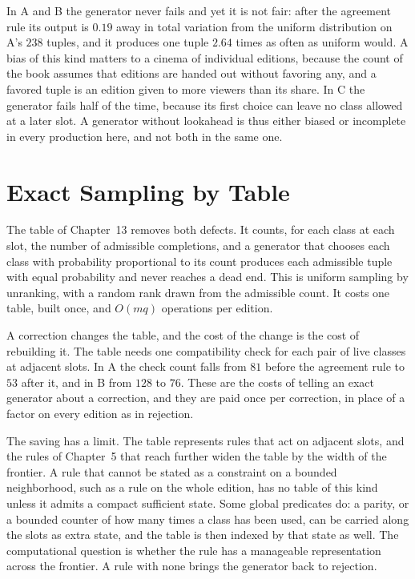 \documentclass[11pt,twoside,openright]{book}
\theoremstyle{plain}
\theoremstyle{definition}
\theoremstyle{remark}
\begin{document}
In A and B the generator never fails and yet it is not fair: after the agreement rule its output is $0.19$ away in total variation from the uniform distribution on A's $238$ tuples, and it produces one tuple $2.64$ times as often as uniform would. A bias of this kind matters to a cinema of individual editions, because the count of the book assumes that editions are handed out without favoring any, and a favored tuple is an edition given to more viewers than its share. In C the generator fails half of the time, because its first choice can leave no class allowed at a later slot. A generator without lookahead is thus either biased or incomplete in every production here, and not both in the same one.

\section{Exact Sampling by Table}\label{sec:table16}

The table of Chapter~13 removes both defects. It counts, for each class at each slot, the number of admissible completions, and a generator that chooses each class with probability proportional to its count produces each admissible tuple with equal probability and never reaches a dead end. This is uniform sampling by unranking, with a random rank drawn from the admissible count. It costs one table, built once, and $O(mq)$ operations per edition.

A correction changes the table, and the cost of the change is the cost of rebuilding it. The table needs one compatibility check for each pair of live classes at adjacent slots. In A the check count falls from $81$ before the agreement rule to $53$ after it, and in B from $128$ to $76$. These are the costs of telling an exact generator about a correction, and they are paid once per correction, in place of a factor on every edition as in rejection.

The saving has a limit. The table represents rules that act on adjacent slots, and the rules of Chapter~5 that reach further widen the table by the width of the frontier. A rule that cannot be stated as a constraint on a bounded neighborhood, such as a rule on the whole edition, has no table of this kind unless it admits a compact sufficient state. Some global predicates do: a parity, or a bounded counter of how many times a class has been used, can be carried along the slots as extra state, and the table is then indexed by that state as well. The computational question is whether the rule has a manageable representation across the frontier. A rule with none brings the generator back to rejection.
\end{document}
